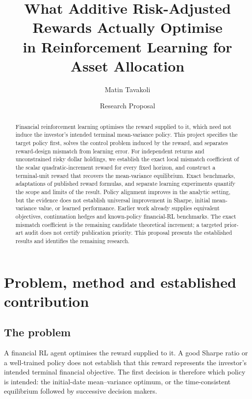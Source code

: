\documentclass[11pt,a4paper]{article}
\title{\vspace{-1.5em}What Additive Risk-Adjusted Rewards Actually Optimise\\
in Reinforcement Learning for Asset Allocation}
\author{Matin Tavakoli}
\date{Research Proposal}
\theoremstyle{plain}
\theoremstyle{definition}
\begin{document}
\maketitle
\vspace{-1.5em}


\begin{abstract}

\noindent Financial reinforcement learning optimises the reward supplied to it, which need not induce the investor's intended terminal mean-variance policy. This project specifies the target policy first, solves the control problem induced by the reward, and separates reward-design mismatch from learning error. For independent returns and unconstrained risky dollar holdings, we establish the exact local mismatch coefficient of the scalar quadratic-increment reward for every fixed horizon, and construct a terminal-unit reward that recovers the mean-variance equilibrium. Exact benchmarks, adaptations of published reward formulas, and separate learning experiments quantify the scope and limits of the result. Policy alignment improves in the analytic setting, but the evidence does not establish universal improvement in Sharpe, initial mean-variance value, or learned performance. Earlier work already supplies equivalent objectives, continuation hedges and known-policy financial-RL benchmarks. The exact mismatch coefficient is the remaining candidate theoretical increment; a targeted prior-art audit does not certify publication priority. This proposal presents the established results and identifies the remaining research.

\end{abstract}

\section{Problem, method and established contribution}

\subsection{The problem}
A financial RL agent optimises the reward supplied to it. A good Sharpe ratio or a well-trained policy does not establish that this reward represents the investor's intended terminal financial objective. The first decision is therefore which policy is intended: the initial-date mean--variance optimum, or the time-consistent equilibrium followed by successive decision makers.
\end{document}
